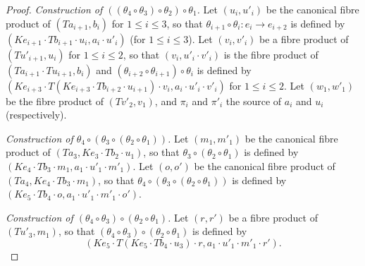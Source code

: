 \documentclass[fleqn]{article}
\newcommand{\oldpage}[1]{\marginpar{\footnotesize$\Big\vert$ \textit{p.~#1}}}
\begin{document}
\begin{proof}
  \medskip

  \emph{Construction of $((\theta_4\circ\theta_3)\circ\theta_2)\circ\theta_1$.}
  Let $(u_i,u'_i)$ be the canonical fibre product of $(Ta_{i+1},b_i)$ for $1\leqslant i\leqslant3$, so that $\theta_{i+1}\circ\theta_i\colon e_i\to e_{i+2}$ is defined by $(Ke_{i+1}\cdot Tb_{i+1}\cdot u_i, a_i\cdot u'_i)$ (for $1\leqslant i\leqslant 3$).
  \oldpage{252}
  Let $(v_i,v'_i)$ be a fibre product of $(Tu'_{i+1},u_i)$ for $1\leqslant i\leqslant 2$, so that $(v_i,u'_i\cdot v'_i)$ is the fibre product of $(Ta_{i+1}\cdot Tu_{i+1},b_i)$ and $(\theta_{i+2}\circ\theta_{i+1})\circ\theta_i$ is defined by $(Ke_{i+3}\cdot T(Ke_{i+3}\cdot Tb_{i+2}\cdot u_{i+1})\cdot v_i,a_i\cdot u'_i\cdot v'_i)$ for $1\leqslant i\leqslant 2$.
  Let $(w_1,w'_1)$ be the fibre product of $(Tv'_2,v_1)$, and $\pi_i$ and $\pi'_i$ the source of $a_i$ and $u_i$ (respectively).

  \medskip

  \emph{Construction of $\theta_4\circ(\theta_3\circ(\theta_2\circ\theta_1))$.}
  Let $(m_1,m'_1)$ be the canonical fibre product of $(Ta_3,Ke_3\cdot Tb_2\cdot u_1)$, so that $\theta_3\circ(\theta_2\circ\theta_1)$ is defined by $(Ke_4\cdot Tb_3\cdot m_1,a_1\cdot u'_1\cdot m'_1)$.
  Let $(o,o')$ be the canonical fibre product of $(Ta_4,Ke_4\cdot Tb_3\cdot m_1)$, so that $\theta_4\circ(\theta_3\circ(\theta_2\circ\theta_1))$ is defined by $(Ke_5\cdot Tb_4\cdot o,a_1\cdot u'_1\cdot m'_1\cdot o')$.

  \medskip

  \emph{Construction of $(\theta_4\circ\theta_3)\circ(\theta_2\circ\theta_1)$.}
  Let $(r,r')$ be a fibre product of $(Tu'_3,m_1)$, so that $(\theta_4\circ\theta_3)\circ(\theta_2\circ\theta_1)$ is defined by
  \[
    (Ke_5\cdot T(Ke_5\cdot Tb_4\cdot u_3)\cdot r, a_1\cdot u'_1\cdot m'_1\cdot r').
  \]

  \medskip


\end{proof}
\end{document}
